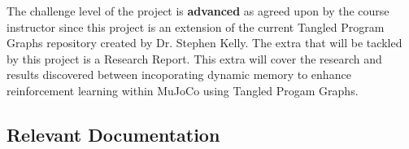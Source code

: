 \documentclass[12pt, titlepage]{article}
\begin{document}

The challenge level of the project is \textbf{advanced} as agreed upon by the course instructor since this project is an extension of the current Tangled Program Graphs repository created by Dr. Stephen Kelly.
The extra that will be tackled by this project is a Research Report. This extra will cover the research and results discovered between incoporating dynamic memory to enhance reinforcement learning within MuJoCo using Tangled Progam Graphs.

\subsection{Relevant Documentation}

\end{document}
